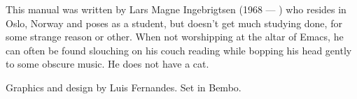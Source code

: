 \gnuscleardoublepage

\pagestyle{gnusindex}

\renewcommand\indexname{Key Index}
\renewcommand{\gnuschaptername}{Key Index}

\gnuscleardoublepage

\renewcommand\indexname{Function and Variable Index}
\renewcommand{\gnuschaptername}{Function and Variable Index}

\gnuscleardoublepage
\thispagestyle{empty}

\renewcommand\indexname{Concept Index}
\renewcommand{\gnuschaptername}{Concept Index}


\gnuscleardoublepage
\mbox{}
\thispagestyle{empty}
\vfill

This manual was written by Lars Magne Ingebrigtsen (1968 --- ) who
resides in Oslo, Norway and poses as a student, but doesn't get much
studying done, for some strange reason or other.  When not worshipping
at the altar of Emacs, he can often be found slouching on his couch
reading while bopping his head gently to some obscure music.  He does
not have a cat.

Graphics and design by Luis Fernandes.  Set in Bembo.

\clearpage
\mbox{}
\thispagestyle{empty}
\vfill
\hspace*{-1cm}
\vfill
\mbox{}


